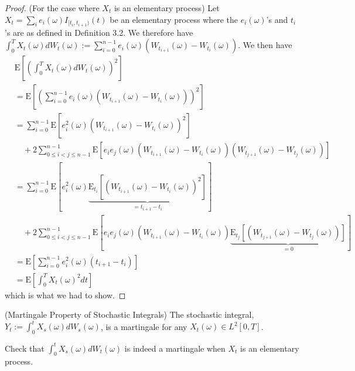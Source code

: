 \begin{proof} (For the case where $X_t$ is an elementary process)
Let $X_t=\sum_i e_i(\omega)I_{[t_i,t_{i+1})}(t)$ be an elementary process where the $e_i(\omega)$'s and $t_i$'s are as defined in Definition 3.2. We therefore have $\int_0^T X_t(\omega) dW_t(\omega) := \sum_{i=0}^{n-1} e_i(\omega) (W_{t_{i+1}}(\omega)-W_{t_i}(\omega))$. We then have
\begin{align*}
&\mathrm{E}\left[\left(\int_0^T X_t(\omega) dW_t(\omega)\right)^2\right] \\
&= \mathrm{E}\left[\left(\sum_{i=0}^{n-1} e_i(\omega) (W_{t_{i+1}}(\omega)-W_{t_i}(\omega))\right)^2\right] \\
&= \sum_{i=0}^{n-1} \mathrm{E}\left[e_i^2(\omega) (W_{t_{i+1}}(\omega)-W_{t_i}(\omega))^2\right] \\
&\quad + 2\sum_{0\leq i<j\leq n-1}^{n-1} \mathrm{E}\left[e_i e_j(\omega) (W_{t_{i+1}}(\omega)-W_{t_i}(\omega)) (W_{t_{j+1}}(\omega)-W_{t_j}(\omega))\right] \\
&= \sum_{i=0}^{n-1} \mathrm{E}\left[e_i^2(\omega) \underbrace{\mathrm{E}_{t_i}\left[(W_{t_{i+1}}(\omega)-W_{t_i}(\omega))^2\right]}_{=t_{i+1}-t_i}\right] \\
&\quad + 2\sum_{0\leq i<j\leq n-1}^{n-1} \mathrm{E}\left[e_i e_j(\omega) (W_{t_{i+1}}(\omega)-W_{t_i}(\omega)) \underbrace{\mathrm{E}_{t_j}\left[(W_{t_{j+1}}(\omega)-W_{t_j}(\omega))\right]}_{=0}\right] \\
&= \mathrm{E}\left[\sum_{i=0}^{n-1} e_i^2(\omega)(t_{i+1}-t_i)\right] \\
&= \mathrm{E}\left[\int_0^T X_t(\omega)^2 dt\right]
\end{align*}
which is what we had to show.
\end{proof}

\begin{theorem} (Martingale Property of Stochastic Integrals)
The stochastic integral, $Y_t:=\int_0^t X_s(\omega) dW_s(\omega)$, is a martingale for any $X_t(\omega)\in L^2[0,T]$.
\end{theorem}

\begin{example}
Check that $\int_0^t X_s(\omega) dW_t(\omega)$ is indeed a martingale when $X_t$ is an elementary process. 
\end{example}

